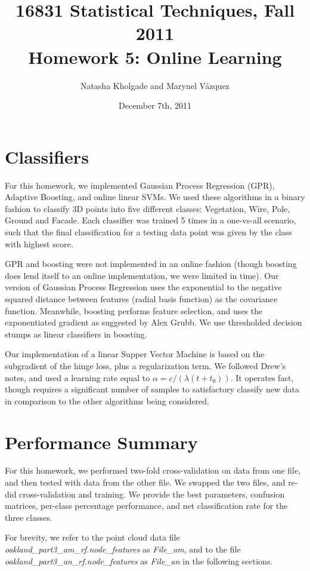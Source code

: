 \documentclass[letterpaper]{article}
\title{16831 Statistical Techniques, Fall 2011\\Homework 5: Online Learning}
\date{December 7th, 2011}
\author{Natasha Kholgade and Marynel V\'azquez}
\begin{document}
\maketitle

\section*{Classifiers}
For this homework, we implemented Gaussian Process Regression (GPR),
Adaptive Boosting, and online linear SVMs. We used these algorithms in a binary
fashion to classify 3D points into five different classes: Vegetation,
Wire, Pole, Ground and Facade. Each classifier was trained 5 times in
a one-vs-all scenario, such that the final classification for a
testing data point was given by the class with highest score.

GPR and boosting were not implemented in an online fashion (though
boosting does lend itself to an online implementation, we were limited
in time). Our version of Gaussian Process Regression uses the
exponential to the negative squared distance between features (radial
basis function) as the covariance function. Meanwhile, boosting
performs feature selection, and uses the exponentiated gradient as
suggested by Alex Grubb. We use thresholded decision stumps as linear
classifiers in boosting.

Our implementation of a linear Supper Vector Machine is based on the
subgradient of the hinge loss, plus a regularization term. We followed
Drew's notes, and used a learning rate equal to $\alpha = c/(\lambda(t
+ t_0))$. It operates fast, though requires a significant number of
samples to satisfactory classify new data in comparison to the other
algorithms being considered.

\section*{Performance Summary}
For this homework, we performed two-fold cross-validation on data from
one file, and then tested with data from the other file. We swapped
the two files, and re-did cross-validation and training. We provide
the best parameters, confusion matrices, per-class percentage
performance, and net classification rate for the three classes.

For brevity, we refer to the point cloud data file
\textit{oakland\_part3\_am\_rf.node\_features} as \textit{File\_am}, and
to the file \textit{oakland\_part3\_an\_rf.node\_features} as
\textit{File\_an} in the following sections.
\end{document}
